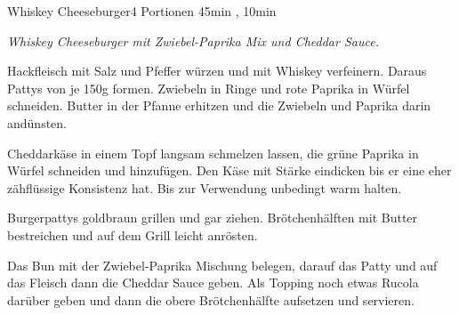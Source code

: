 \documentclass[../recipe-collections/cooking.tex]{subfiles}
\begin{document}
\begin{recipe}{Whiskey Cheeseburger}{4 Portionen }{45min , 10min }

  \freeform{}\textit{Whiskey Cheeseburger mit Zwiebel-Paprika Mix und Cheddar Sauce.}


  Hackfleisch mit Salz und Pfeffer würzen und mit Whiskey verfeinern.
  Daraus Pattys von je 150g formen.
  Zwiebeln in Ringe und rote Paprika in Würfel schneiden.
  Butter in der Pfanne erhitzen und die Zwiebeln und Paprika darin andünsten.


  Cheddarkäse in einem Topf langsam schmelzen lassen, die grüne Paprika in Würfel schneiden und hinzufügen.
  Den Käse mit Stärke eindicken bis er eine eher zähflüssige Konsistenz hat. Bis zur Verwendung unbedingt warm halten.

  \newstep{}Burgerpattys goldbraun grillen und gar ziehen.
  Brötchenhälften mit Butter bestreichen und auf dem Grill leicht anrösten.


  Das Bun mit der Zwiebel-Paprika Mischung belegen, darauf das Patty und auf das Fleisch dann die Cheddar Sauce geben.
  Als Topping noch etwas Rucola darüber geben und dann die obere Brötchenhälfte aufsetzen und servieren.

  \freeform{}\hrulefill{}

\end{recipe}
\end{document}
